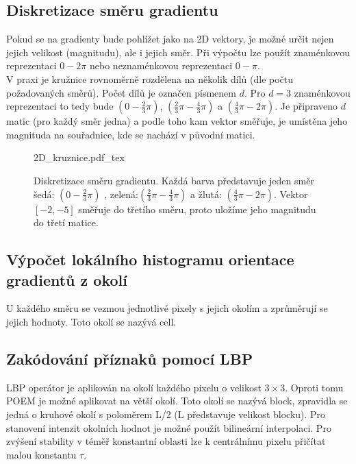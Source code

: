 \documentclass[czech,BP]{thesiskiv}
\begin{document}
\subsection{Diskretizace směru gradientu}
Pokud se na gradienty bude pohlížet jako na 2D vektory, je možné určit nejen jejich velikost (magnitudu), ale i jejich směr. Při výpočtu lze použít znaménkovou reprezentaci $0 - 2\pi$ nebo neznaménkovou reprezentaci $0 - \pi$. \\
V praxi je kružnice rovnoměrně rozdělena na několik dílů (dle počtu požadovaných směrů). Počet dílů  je označen písmenem $d$. Pro $d = 3$ znaménkovou reprezentaci to tedy bude $\left(0 - \frac{2}{3}\pi \right)$, $\left(\frac{2}{3}\pi - \frac{4}{3}\pi \right)$ a $\left(\frac{4}{3}\pi - 2\pi \right)$. Je připraveno $d$ matic (pro každý směr jedna) a podle toho kam vektor směřuje, je umístěna jeho magnituda na souřadnice, kde se nachází v původní matici. 

\begin{figure}[H]
    \centering    
    \def\svgwidth{230pt}
	{2D_kruznice.pdf_tex}    
    \caption{Diskretizace směru gradientu. Každá barva představuje jeden směr šedá: $\left(0 - \frac{2}{3}\pi \right)$ , zelená:$\left(\frac{2}{3}\pi - \frac{4}{3}\pi \right)$ a žlutá: $\left(\frac{4}{3}\pi - 2\pi \right)$. Vektor $[ -2, -5 ]$ směřuje do třetího směru, proto uložíme jeho magnitudu do třetí matice. }
    \label{fig: 2D_graf}
\end{figure}

\subsection{Výpočet lokálního histogramu orientace gradientů z okolí}
U každého směru  se vezmou jednotlivé pixely s jejich okolím a zprůměrují se jejich hodnoty. Toto okolí se nazývá cell. \\

\subsection{Zakódování příznaků pomocí LBP}
\par LBP operátor je aplikován na okolí každého pixelu o velikost $3 \times 3$. Oproti tomu POEM je možné aplikovat na větší okolí. Toto okolí se nazývá block, zpravidla se jedná o kruhové okolí s poloměrem L/2 (L představuje velikost blocku). Pro stanovení intenzit okolních hodnot je možné použít bilineární interpolaci. Pro zvýšení stability v téměř konstantní oblasti lze k centrálnímu pixelu přičítat malou konstantu $\tau$. 
\end{document}
